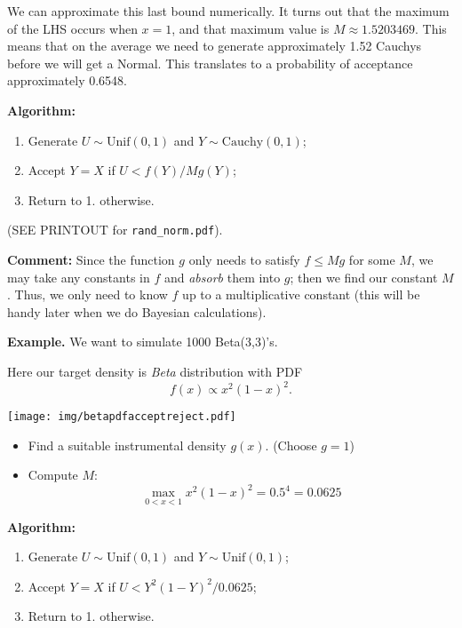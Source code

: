 \documentclass[captions=tableheading]{scrbook}
\begin{document}
We can approximate this last bound numerically. It turns out that the maximum of the LHS occurs when $x=1$, and that maximum value is \(M \approx 1.5203469\). This means that on the average we need to generate approximately 1.52 Cauchys before we will get a Normal. This translates to a probability of acceptance approximately 0.6548.

\textbf{Algorithm:}

\begin{enumerate}
\item Generate $U \sim \mathrm{Unif}(0,1)$ and $Y \sim \mathrm{Cauchy}(0,1)$;
\item Accept $Y = X$ if $U < f(Y)/Mg(Y)$;
\item Return to 1. otherwise.
\end{enumerate}

(SEE PRINTOUT for \texttt{rand\_norm.pdf}).

\textbf{Comment:} Since the function $g$ only needs to satisfy $f\leq Mg$ for some $M$, we may take any constants in $f$ and \emph{absorb} them into $g$; then we find our constant $M$. Thus, we only need to know $f$ up to a multiplicative constant (this will be handy later when we do Bayesian calculations).

\textbf{Example.} We want to simulate 1000 Beta(3,3)'s.

Here our target density is \emph{Beta} distribution with PDF 
\[
f(x)\propto x^{2}(1-x)^{2}.
\]
\begin{center}

\texttt{[image: img/betapdfacceptreject.pdf]}

\end{center}

\begin{itemize}
\item Find a suitable instrumental density $g(x)$. (Choose $g=1$)
\item Compute $M$: 
   \[
   \max_{0<x<1}x^{2}(1-x)^{2}=0.5^{4}=0.0625
   \]
\end{itemize}

\textbf{Algorithm:}

\begin{enumerate}
\item Generate $U \sim \mathrm{Unif}(0,1)$ and $Y \sim \mathrm{Unif}(0,1)$;
\item Accept $Y = X$ if $U < Y^{2}(1-Y)^{2}/0.0625$;
\item Return to 1. otherwise.
\end{enumerate}
\end{document}
